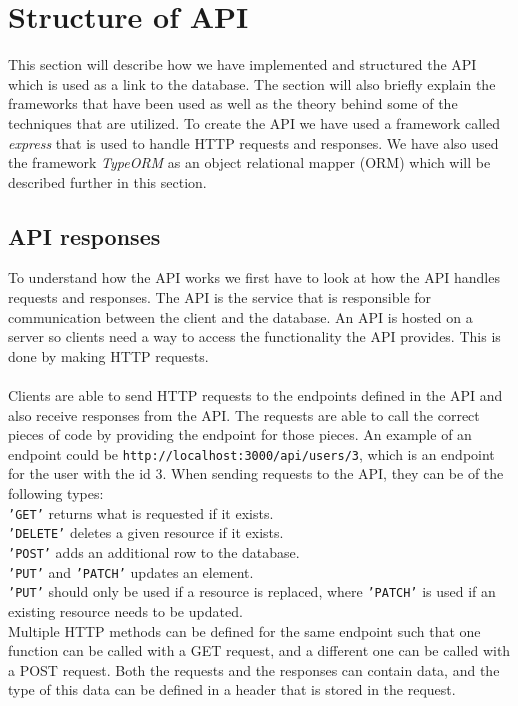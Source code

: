 \section{Structure of API}
This section will describe how we have implemented and structured the API which is used as a link to the database.
The section will also briefly explain the frameworks that have been used as well as the theory behind some of the techniques that are utilized.
To create the API we have used a framework called \textit{express} that is used to handle HTTP requests and responses.
We have also used the framework \textit{TypeORM} as an object relational mapper (ORM) which will be described further in this section.

\subsection{API responses}
To understand how the API works we first have to look at how the API handles requests and responses.
The API is the service that is responsible for communication between the client and the database. 
An API is hosted on a server so clients need a way to access the functionality the API provides.
This is done by making HTTP requests. 
\\\\
Clients are able to send HTTP requests to the endpoints defined in the API and also receive responses from the API.
The requests are able to call the correct pieces of code by providing the endpoint for those pieces.
An example of an endpoint could be \texttt{http://localhost:3000/api/users/3}, which is an endpoint for the user with the id 3.
When sending requests to the API, they can be of the following types:\\
\texttt{'GET'} returns what is requested if it exists.\\
\texttt{'DELETE'} deletes a given resource if it exists.\\
\texttt{'POST'} adds an additional row to the database.\\
\texttt{'PUT'} and \texttt{'PATCH'} updates an element. \\
\texttt{'PUT'} should only be used if a resource is replaced, where \texttt{'PATCH'} is used if an existing resource needs to be updated.\\
Multiple HTTP methods can be defined for the same endpoint such that one function can be called with a GET request, and a different one can be called with a POST request. 
Both the requests and the responses can contain data, and the type of this data can be defined in a header that is stored in the request.
